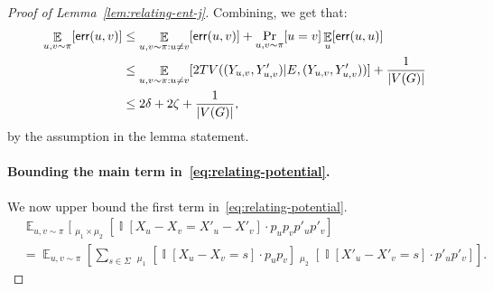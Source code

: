 \documentclass[11pt]{article}
\DeclareMathOperator*{\E}{\mathbb{E}}
\DeclareMathOperator*{\pE}{\widetilde{\mathbb{E}}}
\DeclareMathOperator*{\Ind}{\mathbb{I}}
\theoremstyle{definition}
\begin{document}
\begin{proof}[Proof of Lemma~\ref{lem:relating-ent-j}]
Combining, we get that: 
\begin{align}\label{eq:err-uv}
\E_{u,v \sim \pi}[{\sf err}(u,v)] &\leq \E_{u,v \sim \pi: u \neq v}[{\sf err}(u,v)] + \Pr_{u, v \sim \pi}[u = v]\E_{u}[{\sf err}(u,u)] \notag\\
&\leq \E_{u,v \sim \pi: u \neq v}[2 TV((Y_{u,v},Y'_{u,v})|E , (Y_{u,v},Y'_{u,v}))] + \frac{1}{|V(G)|} \notag\\
&\leq 2\delta + 2\zeta + \frac{1}{|V(G)|},
\end{align}
by the assumption in the lemma statement. 
\paragraph{Bounding the main term in~\eqref{eq:relating-potential}.} We now upper bound the first term in~\eqref{eq:relating-potential}. 
\begin{align*}
&\E_{u,v\sim \pi}[\pE_{\mu_1 \times \mu_{2}}\left[ \Ind[X_u - X_v = X'_u- X'_v]\cdot p_u p_vp'_up'_v\right] \\
&=\E_{u,v\sim \pi}\left[\sum_{s \in \Sigma} \pE_{\mu_1}[\Ind[X_u - X_v = s]\cdot p_u p_v]\pE_{\mu_2}[\Ind[X'_u - X'_v = s]\cdot p'_u p'_v]\right].
\end{align*}


\end{proof}
\end{document}
